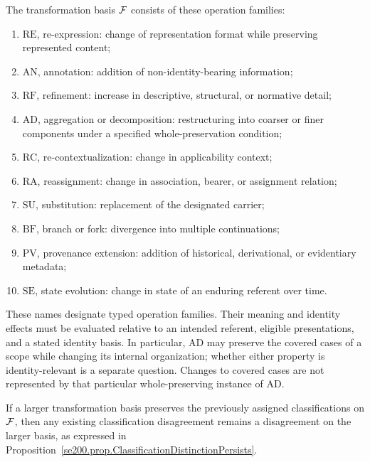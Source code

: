 \begin{definition}
  \label{se200.def.TransformationBasis}
  The transformation basis $\mathcal{F}$ consists of these operation families:
  \begin{enumerate}[label=(\alph*),nosep]
    \item $\mathrm{RE}$, re-expression: change of representation format while preserving represented content;
    \item $\mathrm{AN}$, annotation: addition of non-identity-bearing information;
    \item $\mathrm{RF}$, refinement: increase in descriptive, structural, or normative detail;
    \item $\mathrm{AD}$, aggregation or decomposition: restructuring into coarser or finer components under a specified whole-preservation condition;
    \item $\mathrm{RC}$, re-contextualization: change in applicability context;
    \item $\mathrm{RA}$, reassignment: change in association, bearer, or assignment relation;
    \item $\mathrm{SU}$, substitution: replacement of the designated carrier;
    \item $\mathrm{BF}$, branch or fork: divergence into multiple continuations;
    \item $\mathrm{PV}$, provenance extension: addition of historical, derivational, or evidentiary metadata;
    \item $\mathrm{SE}$, state evolution: change in state of an enduring referent over time.
  \end{enumerate}
\end{definition}

These names designate typed operation families.
Their meaning and
identity effects must be evaluated relative to an intended referent,
eligible presentations, and a stated identity basis.
In particular,
$\mathrm{AD}$ may preserve the covered cases of a scope while changing
its internal organization; whether either property is identity-relevant
is a separate question.
Changes to covered cases are not represented
by that particular whole-preserving instance of $\mathrm{AD}$.

If a larger transformation basis preserves the previously assigned
classifications on $\mathcal{F}$, then any existing classification disagreement
remains a disagreement on the larger basis, as expressed in
Proposition~\ref{se200.prop.ClassificationDistinctionPersists}.


